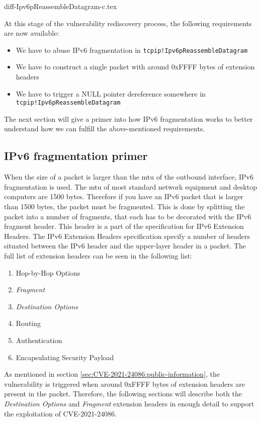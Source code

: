 \documentclass{report}
\begin{document}
{diff-Ipv6pReassembleDatagram-c.tex}

At this stage of the vulnerability rediscovery process, the following requirements are now available:
\begin{itemize}
    \item We have to abuse IPv6 fragmentation in \texttt{tcpip!Ipv6pReassembleDatagram}
    \item We have to construct a single packet with around 0xFFFF bytes of extension headers
    \item We have to trigger a NULL pointer dereference somewhere in \texttt{tcpip!Ipv6pReassembleDatagram}
\end{itemize}

The next section will give a primer into how IPv6 fragmentation works to better understand how we can fulfill the above-mentioned requirements.

\subsection{IPv6 fragmentation primer}
When the size of a packet is larger than the \gls{mtu} of the outbound interface, IPv6 fragmentation is used. The \gls{mtu} of most standard network equipment and desktop computers are 1500 bytes. Therefore if you have an IPv6 packet that is larger than 1500 bytes, the packet must be fragmented. This is done by splitting the packet into a number of fragments, that each has to be decorated with the IPv6 fragment header. This header is a part of the specification for IPv6 Extension Headers\cite[sec. 4.5]{url:rfc:ipv6}. The IPv6 Extension Headers specification specify a number of headers situated between the IPv6 header and the upper-layer header in a packet.
The full list of extension headers can be seen in the following list:

\begin{enumerate}
    \item Hop-by-Hop Options
    \item \emph{Fragment}
    \item \emph{Destination Options}
    \item Routing
    \item Authentication
    \item Encapsulating Security Payload
\end{enumerate}

As mentioned in section \ref{sec:CVE-2021-24086:public-information}, the vulnerability is triggered when around 0xFFFF bytes of extension headers are present in the packet. Therefore, the following sections will describe both the \emph{Destination Options} and \emph{Fragment} extension headers in enough detail to support the exploitation of CVE-2021-24086.
\end{document}
